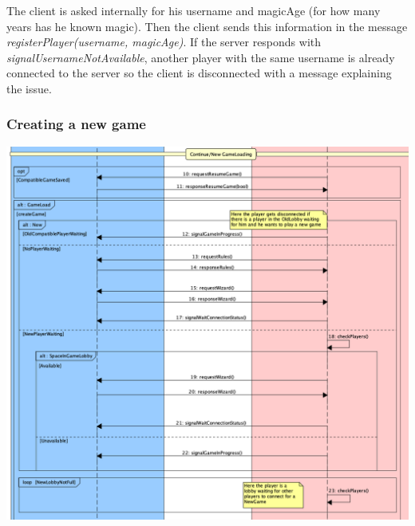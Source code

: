 \documentclass[12pt]{article}
\begin{document}
				The client is asked internally for his username and magicAge (for how many years has he known magic). Then the client sends this information in the message \emph{registerPlayer(username, magicAge)}. If the server responds with \emph{signalUsernameNotAvailable}, another player with the same username is already connected to the server so the client is disconnected with a message explaining the issue.
				
			\subsubsection{Creating a new game}
			
				\begin{center}
					\includegraphics[width=\textwidth,height=\textheight,keepaspectratio]{Connection_3}
				\end{center}
			
\end{document}
